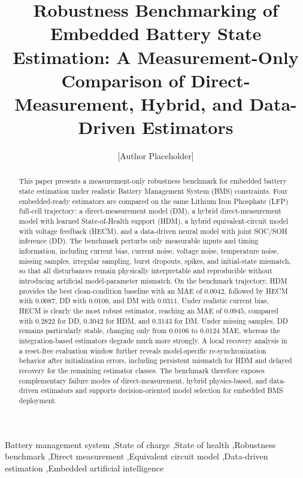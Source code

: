 \documentclass[review]{elsarticle}
\date{}
\begin{document}
\linenumbers
\begin{frontmatter}
\title{Robustness Benchmarking of Embedded Battery State Estimation: A Measurement-Only Comparison of Direct-Measurement, Hybrid, and Data-Driven Estimators}
\author[1]{[Author Placeholder]}
\begin{abstract}
This paper presents a measurement-only robustness benchmark for embedded battery state estimation under realistic Battery Management System (BMS) constraints. Four embedded-ready estimators are compared on the same Lithium Iron Phosphate (LFP) full-cell trajectory: a direct-measurement model (DM), a hybrid direct-measurement model with learned State-of-Health support (HDM), a hybrid equivalent-circuit model with voltage feedback (HECM), and a data-driven neural model with joint SOC/SOH inference (DD). The benchmark perturbs only measurable inputs and timing information, including current bias, current noise, voltage noise, temperature noise, missing samples, irregular sampling, burst dropouts, spikes, and initial-state mismatch, so that all disturbances remain physically interpretable and reproducible without introducing artificial model-parameter mismatch. On the benchmark trajectory, HDM provides the best clean-condition baseline with an MAE of $0.0042$, followed by HECM with $0.0087$, DD with $0.0106$, and DM with $0.0311$. Under realistic current bias, HECM is clearly the most robust estimator, reaching an MAE of $0.0945$, compared with $0.2822$ for DD, $0.3042$ for HDM, and $0.3143$ for DM. Under missing samples, DD remains particularly stable, changing only from $0.0106$ to $0.0124$ MAE, whereas the integration-based estimators degrade much more strongly. A local recovery analysis in a reset-free evaluation window further reveals model-specific re-synchronization behavior after initialization errors, including persistent mismatch for HDM and delayed recovery for the remaining estimator classes. The benchmark therefore exposes complementary failure modes of direct-measurement, hybrid physics-based, and data-driven estimators and supports decision-oriented model selection for embedded BMS deployment.
\end{abstract}
\begin{keyword}
Battery management system \sep State of charge \sep State of health \sep Robustness benchmark \sep Direct measurement \sep Equivalent circuit model \sep Data-driven estimation \sep Embedded artificial intelligence
\end{keyword}
\end{frontmatter}
\end{document}
